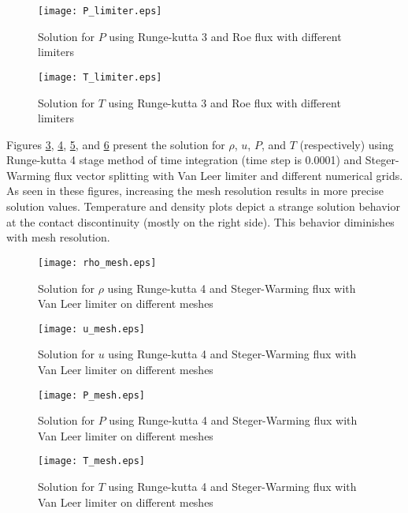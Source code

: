 \documentclass{article}
\begin{document}
\begin{figure}[H]
\centering
\texttt{[image: P\_limiter.eps]}
\caption{Solution for $P$ using Runge-kutta 3 and Roe flux with different limiters}
\label{fig_P_limiter}
\end{figure}

\begin{figure}[H]
\centering
\texttt{[image: T\_limiter.eps]}
\caption{Solution for $T$ using Runge-kutta 3 and Roe flux with different limiters}
\label{fig_T_limiter}
\end{figure}

Figures \ref{fig_rho_mesh}, \ref{fig_u_mesh}, \ref{fig_P_mesh}, and \ref{fig_T_mesh} present the solution for $\rho$, $u$, $P$, and $T$ (respectively) using Runge-kutta 4 stage method of time integration (time step is 0.0001) and Steger-Warming flux vector splitting with Van Leer limiter and different numerical grids. As seen in these figures, increasing the mesh resolution results in more precise solution values. Temperature and density plots depict a strange solution behavior at the contact discontinuity (mostly on the right side). This behavior diminishes with mesh resolution.

\begin{figure}[H]
\centering
\texttt{[image: rho\_mesh.eps]}
\caption{Solution for $\rho$ using Runge-kutta 4 and Steger-Warming flux with Van Leer limiter on different meshes}
\label{fig_rho_mesh}
\end{figure}

\begin{figure}[H]
\centering
\texttt{[image: u\_mesh.eps]}
\caption{Solution for $u$ using Runge-kutta 4 and Steger-Warming flux with Van Leer limiter on different meshes}
\label{fig_u_mesh}
\end{figure}

\begin{figure}[H]
\centering
\texttt{[image: P\_mesh.eps]}
\caption{Solution for $P$ using Runge-kutta 4 and Steger-Warming flux with Van Leer limiter on different meshes}
\label{fig_P_mesh}
\end{figure}

\begin{figure}[H]
\centering
\texttt{[image: T\_mesh.eps]}
\caption{Solution for $T$ using Runge-kutta 4 and Steger-Warming flux with Van Leer limiter on different meshes}
\label{fig_T_mesh}
\end{figure}
\end{document}
